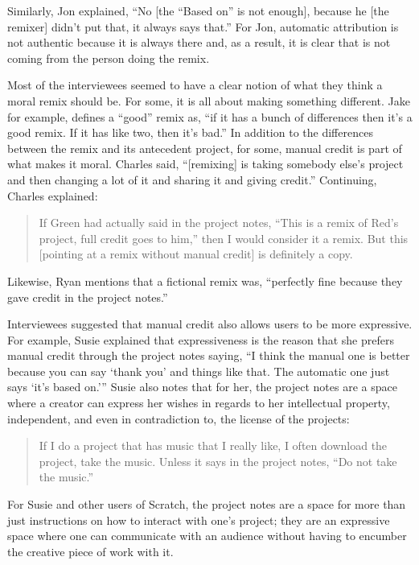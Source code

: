 Similarly, Jon explained, ``No [the ``Based on'' is not enough],
because he [the remixer] didn't put that, it always says that.'' For
Jon, automatic attribution is not authentic because it is always there
and, as a result, it is clear that is not coming from the person doing
the remix.

Most of the interviewees seemed to have a clear notion of what they
think a moral remix should be. For some, it is all about making
something different. Jake for example, defines a ``good'' remix as,
``if it has a bunch of differences then it’s a good remix. If it has
like two, then it’s bad.''  In addition to the differences between the
remix and its antecedent project, for some, manual credit is part of
what makes it moral. Charles said, ``[remixing] is taking somebody
else's project and then changing a lot of it and sharing it and giving
credit.''  Continuing, Charles explained:

\begin{quote}
  If Green had actually said in the project notes, ``This is a remix
  of Red's project, full credit goes to him,'' then I would consider
  it a remix.  But this [pointing at a remix without manual credit] is
  definitely a copy.
\end{quote}

Likewise, Ryan mentions that a fictional remix was, ``perfectly fine
because they gave credit in the project notes.''

Interviewees suggested that manual credit also allows users to be more
expressive. For example, Susie explained that expressiveness is the
reason that she prefers manual credit through the project notes
saying, ``I think the manual one is better because you can say `thank
you' and things like that.  The automatic one just says `it's based
on.''' Susie also notes that for her, the project notes are a space
where a creator can express her wishes in regards to her intellectual
property, independent, and even in contradiction to, the license of
the projects:

\begin{quote}
  If I do a project that has music that I really like, I often
  download the project, take the music.  Unless it says in the project
  notes, ``Do not take the music.''
\end{quote}

For Susie and other users of Scratch, the project notes are a space
for more than just instructions on how to interact with one's project;
they are an expressive space where one can communicate with an
audience without having to encumber the creative piece of work with
it.

